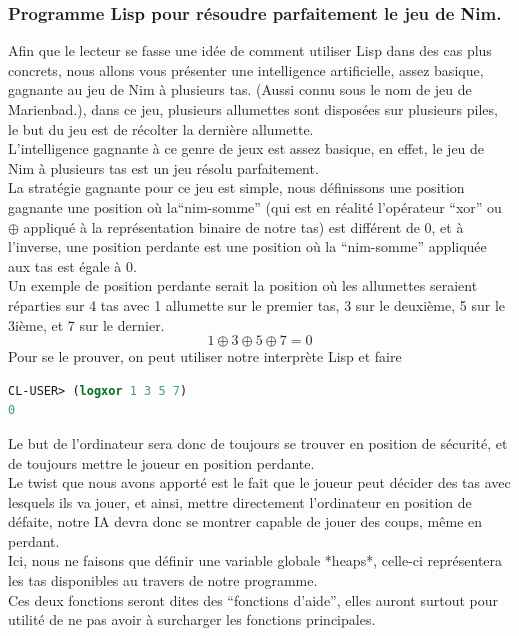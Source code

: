\documentclass[a4paper, 12pt]{article}
\numberwithin{equation}{subsection}
\begin{document}
\subsubsection{Programme Lisp pour résoudre parfaitement le jeu de Nim.}
Afin que le lecteur se fasse une idée de comment utiliser Lisp dans des cas plus concrets, nous allons vous présenter une intelligence artificielle, assez basique, gagnante au jeu de Nim à plusieurs tas. (Aussi connu sous le nom de jeu de Marienbad.), dans ce jeu, plusieurs allumettes sont disposées sur plusieurs piles, le but du jeu est de récolter la dernière allumette. \\

L'intelligence gagnante à ce genre de jeux est assez basique, en effet, le jeu de Nim à plusieurs tas est un jeu résolu parfaitement. \\

La stratégie gagnante pour ce jeu est simple, nous définissons une position gagnante une position où la``nim-somme'' (qui est en réalité l'opérateur ``xor'' ou $\oplus$ appliqué à la représentation binaire de notre tas) est différent de 0, et à l'inverse, une position perdante est une position où la ``nim-somme'' appliquée aux tas est égale à 0. \\

Un exemple de position perdante serait la position où les allumettes seraient réparties sur 4 tas avec 1 allumette sur le premier tas, 3 sur le deuxième, 5 sur le 3ième, et 7 sur le dernier. \\
$$1 \oplus 3 \oplus 5 \oplus 7 = 0$$
Pour se le prouver, on peut utiliser notre interprète Lisp et faire
\begin{lstlisting}[language=Lisp]
CL-USER> (logxor 1 3 5 7)
0
\end{lstlisting}
Le but de l'ordinateur sera donc de toujours se trouver en position de sécurité, et de toujours mettre le joueur en position perdante. \\

Le twist que nous avons apporté est le fait que le joueur peut décider des tas avec lesquels ils va jouer, et ainsi, mettre directement l'ordinateur en position de défaite, notre IA devra donc se montrer capable de jouer des coups, même en perdant. \\

Ici, nous ne faisons que définir une variable globale *heaps*, celle-ci représentera les tas disponibles au travers de notre programme. \\

Ces deux fonctions seront dites des ``fonctions d'aide'', elles auront surtout pour utilité de ne pas avoir à surcharger les fonctions principales. \\
\end{document}
